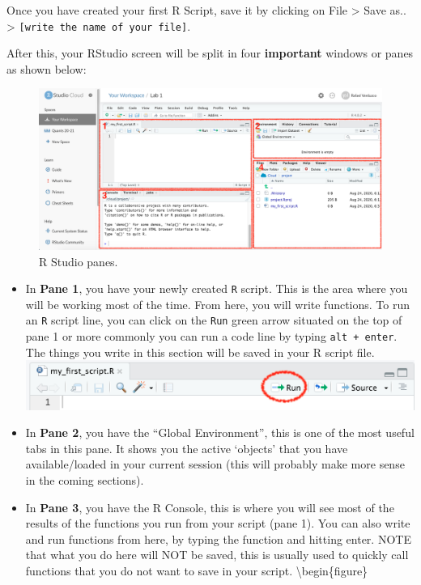 \documentclass[
]{book}
\providecommand{\tightlist}{%
  \setlength{\itemsep}{0pt}\setlength{\parskip}{0pt}}
\begin{document}
Once you have created your first R Script, save it by clicking on File \textgreater{} Save as.. \textgreater{} \texttt{{[}write\ the\ name\ of\ your\ file{]}}.

After this, your RStudio screen will be split in four \textbf{important} windows or panes as shown below:

\begin{figure}

\includegraphics[width=1\linewidth]{./images/rstudio_cloud_panels} \hfill{}

\caption{R Studio panes.}\label{fig:unnamed-chunk-7}
\end{figure}

\begin{itemize}
\tightlist
\item
  In \textbf{Pane 1}, you have your newly created \texttt{R} script. This is the area where you will be working most of the time. From here, you will write functions. To run an \texttt{R} script line, you can click on the \texttt{Run} green arrow situated on the top of pane 1 or more commonly you can run a code line by typing \texttt{alt\ +\ enter}. The things you write in this section will be saved in your R script file.
  \includegraphics{./images/rstudio_cloud_run_button.png}
\item
  In \textbf{Pane 2}, you have the ``Global Environment'', this is one of the most useful tabs in this pane. It shows you the active `objects' that you have available/loaded in your current session (this will probably make more sense in the coming sections).
\item
  In \textbf{Pane 3}, you have the R Console, this is where you will see most of the results of the functions you run from your script (pane 1). You can also write and run functions from here, by typing the function and hitting enter. NOTE that what you do here will NOT be saved, this is usually used to quickly call functions that you do not want to save in your script.
  \textbackslash begin\{figure\}
\end{itemize}
\end{document}
